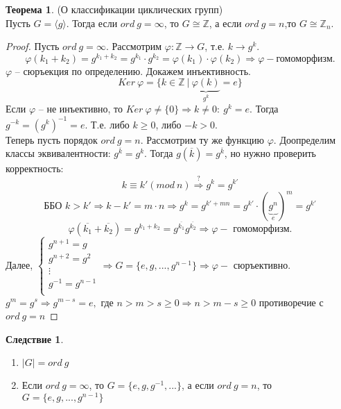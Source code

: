 \documentclass[a4paper, 12pt]{article}
\theoremstyle{definition}
\newtheorem*{theorem}{Теорема}
\newtheorem*{consequense}{Следствие}
\begin{document}
    \begin{theorem}
        (О классификации циклических групп)\\
        Пусть $G = \langle g\rangle$. Тогда если $ord\ g = \infty$, то $G \cong \mathbb{Z}$, а если $ord\ g = n$,то $G \cong \mathbb{Z}_n.$    
    \end{theorem}
    \begin{proof}
        Пусть $ord\ g = \infty$. Рассмотрим $\varphi: \mathbb{Z} \longrightarrow G$, т.е. $k \to g^k$.
        $$\varphi(k_1 + k_2) = g^{k_1 + k_2} = g^{k_1}\cdot g^{k_2} = \varphi(k_1)\cdot \varphi(k_2) \Longrightarrow \varphi - \text{гомоморфизм.}$$   
        $\varphi$ -- сюръекция по определению. Докажем инъективность.
        $$Ker\ \varphi = \{k \in \mathbb{Z}\ |\ \underbrace{\varphi(k)}_{g^k} = e\}$$ 
        Если $\varphi$ -- не инъективно, то $Ker\ \varphi \neq \{0\} \Longrightarrow k \neq 0:\ g^k = e$. Тогда $g^{-k} = (g^k)^{-1} = e$. Т.е. либо $k \geq 0$, либо $-k > 0$.\\
        Теперь пусть порядок $ord\ g = n$. Рассмотрим ту же функцию $\varphi$. Доопределим классы эквивалентности: $g^{\overline{k}} = g^k$. Тогда $g(\overline{k}) = g^{\overline{k}}$, но нужно проверить корректность:
        $$k \equiv k' (mod\ n) \overset{?}{\Longrightarrow} g^k = g^{k'}$$
        $$\text{ББО } k > k' \Longrightarrow k - k' = m\cdot n \Longrightarrow g^k = g^{k' + mn} = g^{k'}\cdot (\underbrace{g^n}_{e})^m = g^{k'}$$
        $$\varphi(\overline{k_1} + \overline{k_2}) = g^{k_1 + k_2} = g^{\overline{k_1}}g^{\overline{k_2}} \Longrightarrow \varphi - \text{ гомоморфизм.}$$
        Далее, $\begin{cases}
            g^{n + 1} = g\\
            g^{n + 2} = g^2\\
            \vdots\\
            g^{-1} = g^{n-1}\\
        \end{cases} \Longrightarrow G = \{e, g,...,g^{n-1}\} \Longrightarrow \varphi - \text{ сюръективно}.$
        $g^m = g^s \Longrightarrow g^{m-s} = e, \text{ где } n > m > s \geq 0 \Longrightarrow n > m - s \geq 0$ противоречие с $ord\ g  =n$ 
    \end{proof}

    \begin{consequense}
        \begin{enumerate}
            \item $|G| = ord\ g$
            \item Если $ord\ g = \infty$, то $G = \{e, g, g^{-1},...\}$, а если $ord\ g = n$, то $G = \{e, g,..., g^{n-1}\}$
        \end{enumerate}
        
    \end{consequense}
\end{document}
